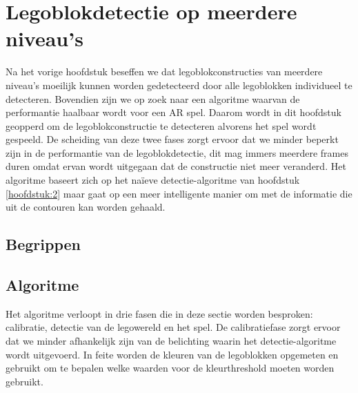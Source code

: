 \chapter{Legoblokdetectie op meerdere niveau's}
\label{hoofdstuk:4}
Na het vorige hoofdstuk beseffen we dat legoblokconstructies van meerdere niveau's moeilijk kunnen worden gedetecteerd door alle legoblokken individueel te detecteren. Bovendien zijn we op zoek naar een algoritme waarvan de performantie haalbaar wordt voor een AR spel. Daarom wordt in dit hoofdstuk geopperd om de legoblokconstructie te detecteren alvorens het spel wordt gespeeld. De scheiding van deze twee fases zorgt ervoor dat we minder beperkt zijn in de performantie van de legoblokdetectie, dit mag immers meerdere frames duren omdat ervan wordt uitgegaan dat de constructie niet meer veranderd. Het algoritme baseert zich op het na\"ieve detectie-algoritme van hoofdstuk \ref{hoofdstuk:2} maar gaat op een meer intelligente manier om met de informatie die uit de contouren kan worden gehaald.


\section{Begrippen}

\section{Algoritme}
Het algoritme verloopt in drie fasen die in deze sectie worden besproken: calibratie, detectie van de legowereld en het spel. De calibratiefase zorgt ervoor dat we  minder afhankelijk zijn van de belichting waarin het detectie-algoritme wordt uitgevoerd. In feite worden de kleuren van de legoblokken opgemeten en gebruikt om te bepalen welke waarden voor de kleurthreshold moeten worden gebruikt. 

